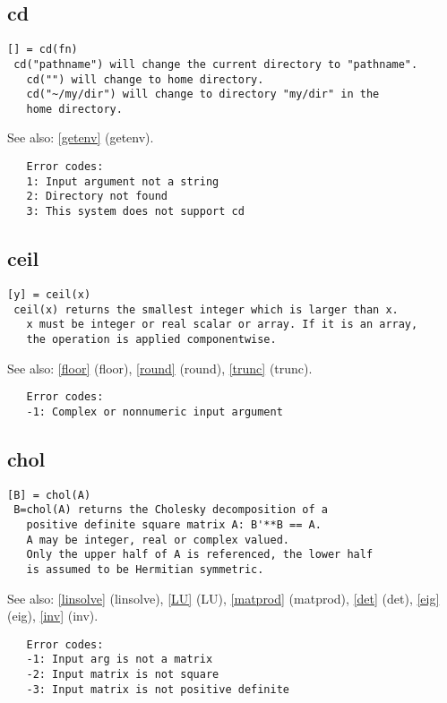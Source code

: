 \documentclass[a4paper]{article}
\begin{document}
\subsection{cd\label{cd}}

\begin{tscreen}
\begin{verbatim}
[] = cd(fn)
 cd("pathname") will change the current directory to "pathname".
   cd("") will change to home directory.
   cd("~/my/dir") will change to directory "my/dir" in the
   home directory.
\end{verbatim}

See also: \ref{getenv} {(getenv)}.
\begin{verbatim}
   Error codes:
   1: Input argument not a string
   2: Directory not found
   3: This system does not support cd 
\end{verbatim}
\end{tscreen}





\subsection{ceil\label{ceil}}

\begin{tscreen}
\begin{verbatim}
[y] = ceil(x)
 ceil(x) returns the smallest integer which is larger than x.
   x must be integer or real scalar or array. If it is an array,
   the operation is applied componentwise.
\end{verbatim}

See also: \ref{floor} {(floor)}, \ref{round} {(round)}, \ref{trunc} {(trunc)}.
\begin{verbatim}
   Error codes:
   -1: Complex or nonnumeric input argument 
\end{verbatim}
\end{tscreen}





\subsection{chol\label{chol}}

\begin{tscreen}
\begin{verbatim}
[B] = chol(A)
 B=chol(A) returns the Cholesky decomposition of a
   positive definite square matrix A: B'**B == A.
   A may be integer, real or complex valued.
   Only the upper half of A is referenced, the lower half
   is assumed to be Hermitian symmetric.
\end{verbatim}

See also: \ref{linsolve} {(linsolve)}, \ref{LU} {(LU)}, \ref{matprod} {(matprod)}, \ref{det} {(det)}, \ref{eig} {(eig)}, \ref{inv} {(inv)}.
\begin{verbatim}
   Error codes:
   -1: Input arg is not a matrix
   -2: Input matrix is not square
   -3: Input matrix is not positive definite 
\end{verbatim}
\end{tscreen}
\end{document}
